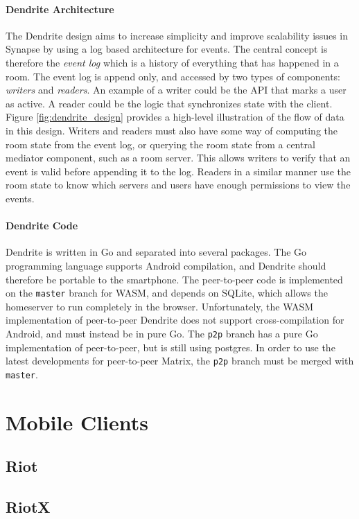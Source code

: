 \paragraph{Dendrite Architecture}
The Dendrite design aims to increase simplicity and improve scalability issues in Synapse by using a log based architecture for events.
The central concept is therefore the \textit{event log} which is a history of everything that has happened in a room.
The event log is append only, and accessed by two types of components: \textit{writers} and \textit{readers}.
An example of a writer could be the API that marks a user as active.
A reader could be the logic that synchronizes state with the client.
Figure \ref{fig:dendrite_design} provides a high-level illustration of the flow of data in this design.
Writers and readers must also have some way of computing the room state from the event log, or querying the room state from a central mediator component, such as a room server.
This allows writers to verify that an event is valid before appending it to the log.
Readers in a similar manner use the room state to know which servers and users have enough permissions to view the events.

\paragraph{Dendrite Code}
Dendrite is written in Go\cite{golang_org} and separated into several packages.
The Go programming language supports Android compilation, and Dendrite should therefore be portable to the smartphone.
The peer-to-peer code is implemented on the \texttt{master} branch for WASM, and depends on SQLite, which allows the homeserver to run completely in the browser.
Unfortunately, the WASM implementation of peer-to-peer Dendrite does not support cross-compilation for Android, and must instead be in pure Go.
The \texttt{p2p} branch has a pure Go implementation of peer-to-peer, but is still using postgres.
In order to use the latest developments for peer-to-peer Matrix, the \texttt{p2p} branch must be merged with \texttt{master}.

\section{Mobile Clients}
\subsection{Riot}
\subsection{RiotX}

